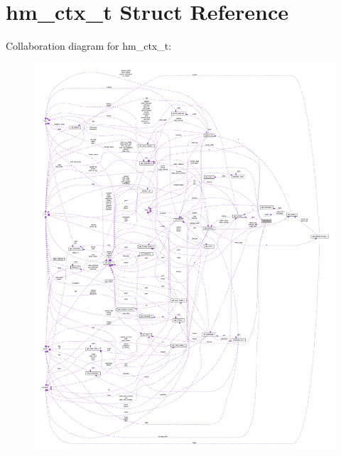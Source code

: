\hypertarget{structhm__ctx__t}{}\section{hm\+\_\+ctx\+\_\+t Struct Reference}
\label{structhm__ctx__t}


Collaboration diagram for hm\+\_\+ctx\+\_\+t\+:
\nopagebreak
\begin{figure}[H]
\begin{center}
\leavevmode
\includegraphics[width=350pt]{structhm__ctx__t__coll__graph}
\end{center}
\end{figure}
